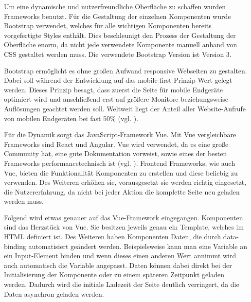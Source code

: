 Um eine dynamische und nutzerfreundliche Oberfläche zu schaffen wurden Frameworks benutzt. 
Für die Gestaltung der einzelnen Komponenten wurde Bootstrap verwendet, welches für alle wichtigen Komponenten bereits vorgefertigte Styles enthält.
Dies beschleunigt den Prozess der Gestaltung der Oberfläche enorm, da nicht jede verwendete Komponente manuell anhand von CSS gestaltet werden muss. 
Die verwendete Bootstrap Version ist Version 3.

Bootstrap ermöglicht es ohne großen Aufwand responsive Webseiten zu gestalten. 
Dabei soll während der Entwicklung auf das mobile-first Prinzip Wert gelegt werden. 
Dieses Prinzip besagt, dass zuerst die Seite für mobile Endgeräte optimiert wird und anschließend erst auf größere Monitore beziehungsweise Auflösungen geachtet werden soll. 
Weltweit liegt der Anteil aller Website-Aufrufe von mobilen Endgeräten bei fast 50\% (vgl. \cite{.stat-mobile}). 

Für die Dynamik sorgt das JavaScript-Framework Vue. Mit Vue vergleichbare Frameworks sind React und Angular. Vue wird verwendet, da es eine große Community hat, eine gute Dokumentation vorweist, sowie eines der besten Frameworks performancetechnisch ist (vgl. \cite{.vue-react-angular}).
Frontend Frameworks, wie auch Vue, bieten die Funktionalität Komponenten zu erstellen und diese beliebig zu verwenden. 
Des Weiteren erhöhen sie, vorausgesetzt sie werden richtig eingesetzt, die Nutzererfahrung, da nicht bei jeder Aktion die komplette Seite neu geladen werden muss.

Folgend wird etwas genauer auf das Vue-Framework eingegangen. 
Komponenten sind das Herzstück von Vue. Sie besitzen jeweils genau ein Template, welches im HTML definiert ist. 
Des Weiteren haben Komponenten Daten, die durch data-binding automatisiert geändert werden. 
Beispielsweise kann man eine Variable an ein Input-Element binden und wenn dieses einen anderen Wert annimmt wird auch automatisch die Variable angepasst. 
Daten können dabei direkt bei der Initialisierung der Komponente oder zu einem späteren Zeitpunkt geladen werden.
Dadurch wird die initiale Ladezeit der Seite deutlich verringert, da die Daten asynchron geladen werden.
